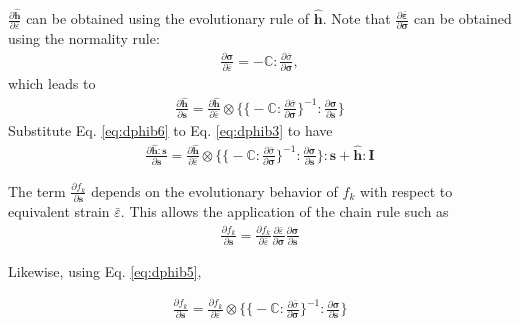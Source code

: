 \documentclass[12pt]{amsart}
\begin{document}
$\frac{\partial{\hat{\mathbf{h}}}}{\partial{\bar{\varepsilon}}} $ can be obtained using the evolutionary rule of $\hat{\mathbf{h}}$.
Note that $\frac{\partial{\bar{\mathbf{\varepsilon}}}}{\partial{\mathbf{\sigma}}}$ can be obtained using the normality rule:
\begin{eqnarray}
  \label{eq:dphib5}
\frac{\partial{\mathbf{\sigma}}}{\partial{\bar{\varepsilon}}} = - \mathbb{C} : \frac{\partial{\bar{\sigma}}}{\partial{\mathbf{\sigma}}},
\end{eqnarray}
which leads to
\begin{eqnarray}
  \label{eq:dphib6}
\frac{\partial{\hat{\mathbf{h}}}}{\partial{\mathbf{s}}}=\frac{\partial{\hat{\mathbf{h}}}}{\partial{\bar{\varepsilon}}}  \otimes \bigg\{ \Big\{- \mathbb{C} : \frac{\partial{\bar{\sigma}}}{\partial{\mathbf{\sigma}}}\Big\}^{-1} :  \frac{\partial{\mathbf{\sigma}}}{\partial{\mathbf{s}}}\bigg\}
\end{eqnarray}
Substitute Eq. \ref{eq:dphib6} to Eq. \ref{eq:dphib3} to have
\begin{eqnarray}
  \label{eq:dphib6_1}
\frac{\partial{\hat{\mathbf{h}}:\mathbf{s}}}{\partial{\mathbf{s}}} =\frac{\partial{\hat{\mathbf{h}}}}{\partial{\bar{\varepsilon}}}  \otimes \bigg\{ \Big\{- \mathbb{C} : \frac{\partial{\bar{\sigma}}}{\partial{\mathbf{\sigma}}}\Big\}^{-1} :  \frac{\partial{\mathbf{\sigma}}}{\partial{\mathbf{s}}}\bigg\}:\mathbf{s} + \hat{\mathbf{h}}:\mathbf{I}
\end{eqnarray}



The term $\frac{\partial{f_k}}{\partial{\mathbf{s}}}$ depends on the evolutionary behavior of $f_k$ with respect to equivalent strain $\bar{\varepsilon}$.
This allows the application of the chain rule such as
\begin{eqnarray}
  \label{eq:dphib7}
\frac{\partial{f_k}}{\partial{\mathbf{s}}}=\frac{\partial{f_k}}{\partial{\bar{\varepsilon}}} \frac{\partial{\bar{\varepsilon}}}{\partial\mathbf{\sigma}} \frac{\partial\mathbf{\sigma}}{\partial\mathbf{s}}
\end{eqnarray}


Likewise, using Eq. \ref{eq:dphib5},

\begin{eqnarray}
  \label{eq:dphib8}
\frac{\partial{f_k}}{\partial{\mathbf{s}}}=\frac{\partial{f_k}}{\partial{\bar{\varepsilon}}}     \otimes \bigg\{ \Big\{- \mathbb{C} : \frac{\partial{\bar{\sigma}}}{\partial{\mathbf{\sigma}}}\Big\}^{-1} :  \frac{\partial{\mathbf{\sigma}}}{\partial{\mathbf{s}}}\bigg\}
\end{eqnarray}
\end{document}
